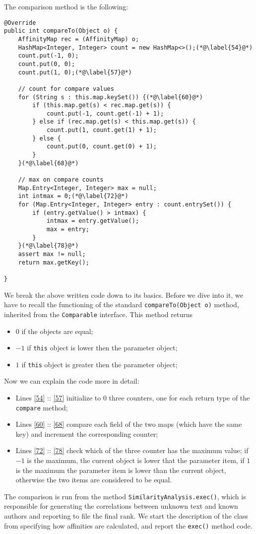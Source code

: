 \documentclass[a4paper,11pt, twoside]{article}
\begin{document}
		\noindent
		The comparison method is the following:
		\begin{lstlisting}[firstnumber=51,caption={AffinityMap comparison method}, captionpos=b, label={lst:comparemethod}]
@Override
public int compareTo(Object o) {
	AffinityMap rec = (AffinityMap) o;
	HashMap<Integer, Integer> count = new HashMap<>();(*@\label{54}@*)
	count.put(-1, 0);
	count.put(0, 0);
	count.put(1, 0);(*@\label{57}@*)
	
	// count for compare values
	for (String s : this.map.keySet()) {(*@\label{60}@*)
		if (this.map.get(s) < rec.map.get(s)) {
			count.put(-1, count.get(-1) + 1);
		} else if (rec.map.get(s) < this.map.get(s)) {
			count.put(1, count.get(1) + 1);
		} else {
			count.put(0, count.get(0) + 1);
		}
	}(*@\label{68}@*)
	
	// max on compare counts
	Map.Entry<Integer, Integer> max = null;
	int intmax = 0;(*@\label{72}@*)
	for (Map.Entry<Integer, Integer> entry : count.entrySet()) {
		if (entry.getValue() > intmax) {
			intmax = entry.getValue();
			max = entry;
		}
	}(*@\label{78}@*)
	assert max != null;
	return max.getKey();

}
	 \end{lstlisting}
	 
	 \noindent
	We break the above written code down to its basics. Before we dive into it, we have to recall the functioning of the standard \lstinline|compareTo(Object o)| method, inherited from the \lstinline|Comparable| interface. This method returns \begin{itemize}
		\item $0$ if the objects are equal;
	 	\item $-1$ if \lstinline|this| object is lower then the parameter object;
	 	\item $1$ if \lstinline|this| object is greater then the parameter object;
	\end{itemize}
 
	\noindent
	 Now we can explain the code more in detail: 
	\begin{itemize}
 		\item Lines \ref{54} :: \ref{57} initialize to 0 three counters, one for each return type of the \lstinline|compare| method;
 		\item Lines \ref{60} :: \ref{68} compare each field of the two maps (which have the same key) and increment the corresponding counter;
 		\item Lines \ref{72} :: \ref{78} check which of the three counter has the maximum value; if $-1$ is the maximum, the current object is lower that the parameter item, if $1$ is the maximum the parameter item is lower than the current object, otherwise the two items are considered to be equal.
 	\end{itemize}
 	The comparison is run from the method \lstinline|SimilarityAnalysis.exec()|, which is responsible for generating the correlations between unknown text and known authors and reporting to file the final rank. We start the description of the class from specifying how affinities are calculated, and report the \lstinline|exec()| method code.
 	
\end{document}
